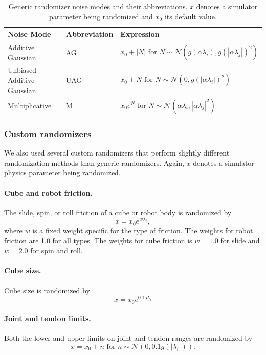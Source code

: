 \begin{table}[h]
	\caption{Generic randomizer noise modes and their abbreviations. $x$ denotes a simulator parameter being randomized and $x_0$ its default value.}
	\centering
	\renewcommand{\arraystretch}{1.3}
    	\begin{tabular}{@{}lll@{}}
        \toprule
        \textbf{Noise Mode} & \textbf{Abbreviation} & \textbf{Expression} \\
    \midrule
	Additive Gaussian & AG & $x_0 + |N| \textrm{ for } N \sim \mathcal{N}(g(\alpha\lambda_i), g(|\alpha\lambda_j|)^2)$ \\
	Unbiased Additive Gaussian & UAG & $x_0 + N \textrm{ for } N \sim \mathcal{N}(0, g(|\alpha\lambda_i|)^2)$ \\
	Multiplicative & M & $x_0 e^{N} \textrm{ for } N \sim \mathcal{N}(\alpha\lambda_i, |\alpha\lambda_j|^2)$ \\
	\bottomrule
	\end{tabular}
	\label{table:noise_modes}
\end{table}

\subsubsection{Custom randomizers}
We also used several custom randomizers that perform slightly different randomization methods than generic randomizers. Again, $x$ denotes a simulator physics parameter being randomized.

\paragraph{Cube and robot friction.} The slide, spin, or roll friction of a cube or robot body is randomized by
\[
x = x_0 e^{w\lambda_i},
\]
where $w$ is a fixed weight specific for the type of friction. The weights for robot friction are 1.0 for all types. The weights for cube friction is $w=1.0$ for slide and $w=2.0$ for spin and roll.

\paragraph{Cube size.} Cube size is randomized by
\[
x = x_0 e^{0.15\lambda_i}
\]

\paragraph{Joint and tendon limits.} Both the lower and upper limits on joint and tendon ranges are randomized by 
\[
x = x_0 + n \textrm{ for } n \sim \mathcal{N}(0, 0.1g(|\lambda_i|)).
\]


